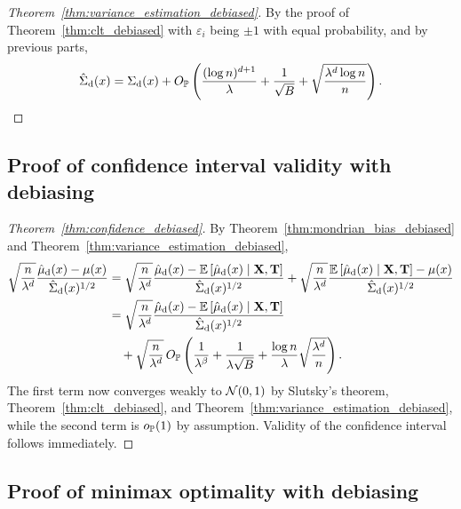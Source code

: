 \begin{proof}[Theorem~\ref{thm:variance_estimation_debiased}]

  By the proof of Theorem~\ref{thm:clt_debiased}
  with $\varepsilon_i$ being $\pm 1$ with equal probability,
  and by previous parts,
  \begin{align*}
    \hat\Sigma_\rd(x)
    = \Sigma_\rd(x)
    + O_\P \left(
      \frac{(\log n)^{d+1}}{\lambda}
      + \frac{1}{\sqrt B}
      + \sqrt{\frac{\lambda^d \log n}{n}}
    \right).
  \end{align*}

\end{proof}

\subsection*{Proof of confidence interval validity with debiasing}

\begin{proof}[Theorem~\ref{thm:confidence_debiased}]
  By Theorem~\ref{thm:mondrian_bias_debiased}
  and Theorem~\ref{thm:variance_estimation_debiased},
  \begin{align*}
    \sqrt{\frac{n}{\lambda^d}}
    \frac{\hat \mu_\rd(x) - \mu(x)}{\hat \Sigma_\rd(x)^{1/2}}
    &=
    \sqrt{\frac{n}{\lambda^d}}
    \frac{\hat \mu_\rd(x) - \E \left[ \hat \mu_\rd(x) \mid \bX, \bT \right]}
    {\hat \Sigma_\rd(x)^{1/2}}
    + \sqrt{\frac{n}{\lambda^d}}
    \frac{\E \left[ \hat \mu_\rd(x) \mid \bX, \bT \right] - \mu(x)}
    {\hat \Sigma_\rd(x)^{1/2}} \\
    &=
    \sqrt{\frac{n}{\lambda^d}}
    \frac{\hat \mu_\rd(x) - \E \left[ \hat \mu_\rd(x) \mid \bX, \bT \right]}
    {\hat \Sigma_\rd(x)^{1/2}} \\
    &\quad+
    \sqrt{\frac{n}{\lambda^d}} \,
    O_\P \left(
      \frac{1}{\lambda^\beta}
      + \frac{1}{\lambda \sqrt B}
      + \frac{\log n}{\lambda} \sqrt{\frac{\lambda^d}{n}}
    \right).
  \end{align*}
  The first term now converges weakly to $\cN(0,1)$ by
  Slutsky's theorem, Theorem~\ref{thm:clt_debiased},
  and Theorem~\ref{thm:variance_estimation_debiased},
  while the second term is $o_\P(1)$ by assumption.
  Validity of the confidence interval follows immediately.
\end{proof}

\subsection*{Proof of minimax optimality with debiasing}

